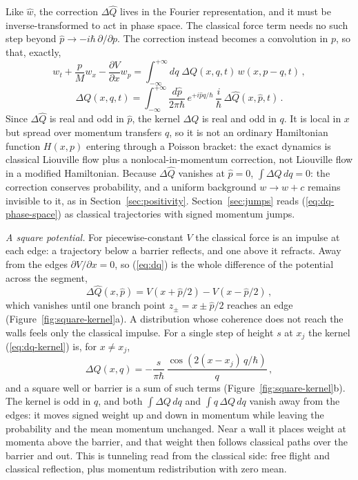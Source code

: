 \documentclass[12pt]{article}
\begin{document}
Like $\hat{w}$, the correction $\Delta\hat{Q}$ lives in the Fourier representation, and it must be inverse-transformed to act in phase space.  The classical force term needs no such step beyond $\hat{p} \rightarrow -i\hbar\,\partial/\partial p$.  The correction instead becomes a convolution in $p$, so that, exactly,
\begin{equation}\label{eq:dq-phase-space}
w_t + \frac{p}{M} w_x - \frac{\partial V}{\partial x} w_p = \int_{-\infty}^{+\infty} dq\; \Delta Q(x,q,t)\, w(x,p-q,t) \,,
\end{equation}
\begin{equation}\label{eq:dq-kernel}
\Delta Q(x,q,t) = \int_{-\infty}^{+\infty} \frac{d\hat{p}}{2\pi\hbar}\, e^{+i\hat{p}q/\hbar}\, \frac{i}{\hbar}\,\Delta\hat{Q}(x,\hat{p},t) \,.
\end{equation}
Since $\Delta\hat{Q}$ is real and odd in $\hat{p}$, the kernel $\Delta Q$ is real and odd in $q$.  It is local in $x$ but spread over momentum transfers $q$, so it is not an ordinary Hamiltonian function $H(x,p)$ entering through a Poisson bracket: the exact dynamics is classical Liouville flow plus a nonlocal-in-momentum correction, not Liouville flow in a modified Hamiltonian.  Because $\Delta\hat{Q}$ vanishes at $\hat{p} = 0$, $\int \Delta Q\,dq = 0$: the correction conserves probability, and a uniform background $w \rightarrow w + c$ remains invisible to it, as in Section~\ref{sec:positivity}.  Section~\ref{sec:jumps} reads (\ref{eq:dq-phase-space}) as classical trajectories with signed momentum jumps.

\textit{A square potential.}  For piecewise-constant $V$ the classical force is an impulse at each edge: a trajectory below a barrier reflects, and one above it refracts.  Away from the edges $\partial V/\partial x = 0$, so (\ref{eq:dq}) is the whole difference of the potential across the segment,
\begin{equation}\label{eq:dq-square}
\Delta\hat{Q}(x,\hat{p}) = V(x+\hat{p}/2) - V(x-\hat{p}/2) \,,
\end{equation}
which vanishes until one branch point $z_\pm = x \pm \hat{p}/2$ reaches an edge (Figure~\ref{fig:square-kernel}a).  A distribution whose coherence does not reach the walls feels only the classical impulse.  For a single step of height $s$ at $x_j$ the kernel (\ref{eq:dq-kernel}) is, for $x \neq x_j$,
\begin{equation}\label{eq:dq-step}
\Delta Q(x,q) = -\frac{s}{\pi\hbar}\,\frac{\cos\!\left(2(x-x_j)\,q/\hbar\right)}{q} \,,
\end{equation}
and a square well or barrier is a sum of such terms (Figure~\ref{fig:square-kernel}b).  The kernel is odd in $q$, and both $\int \Delta Q\,dq$ and $\int q\,\Delta Q\,dq$ vanish away from the edges: it moves signed weight up and down in momentum while leaving the probability and the mean momentum unchanged.  Near a wall it places weight at momenta above the barrier, and that weight then follows classical paths over the barrier and out.  This is tunneling read from the classical side: free flight and classical reflection, plus momentum redistribution with zero mean.
\end{document}
